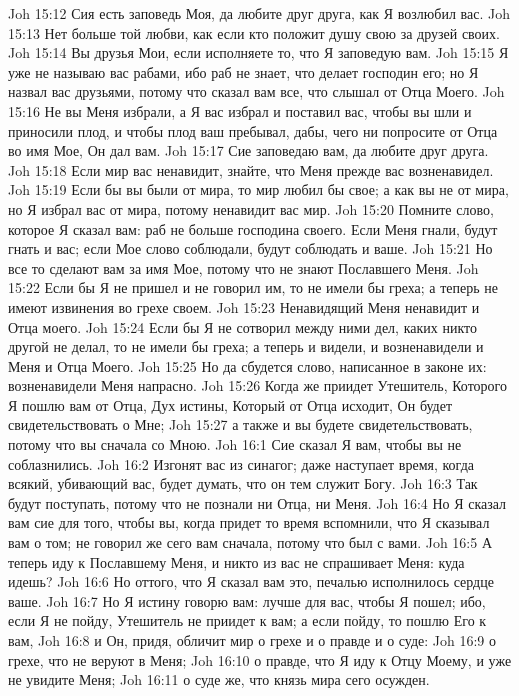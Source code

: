 Joh 15:12  Сия есть заповедь Моя, да любите друг друга, как Я возлюбил вас.
Joh 15:13  Нет больше той любви, как если кто положит душу свою за друзей своих.
Joh 15:14  Вы друзья Мои, если исполняете то, что Я заповедую вам.
Joh 15:15  Я уже не называю вас рабами, ибо раб не знает, что делает господин его; но Я назвал вас друзьями, потому что сказал вам все, что слышал от Отца Моего.
Joh 15:16  Не вы Меня избрали, а Я вас избрал и поставил вас, чтобы вы шли и приносили плод, и чтобы плод ваш пребывал, дабы, чего ни попросите от Отца во имя Мое, Он дал вам.
Joh 15:17  Сие заповедаю вам, да любите друг друга.
Joh 15:18  Если мир вас ненавидит, знайте, что Меня прежде вас возненавидел.
Joh 15:19  Если бы вы были от мира, то мир любил бы свое; а как вы не от мира, но Я избрал вас от мира, потому ненавидит вас мир.
Joh 15:20  Помните слово, которое Я сказал вам: раб не больше господина своего. Если Меня гнали, будут гнать и вас; если Мое слово соблюдали, будут соблюдать и ваше.
Joh 15:21  Но все то сделают вам за имя Мое, потому что не знают Пославшего Меня.
Joh 15:22  Если бы Я не пришел и не говорил им, то не имели бы греха; а теперь не имеют извинения во грехе своем.
Joh 15:23  Ненавидящий Меня ненавидит и Отца моего.
Joh 15:24  Если бы Я не сотворил между ними дел, каких никто другой не делал, то не имели бы греха; а теперь и видели, и возненавидели и Меня и Отца Моего.
Joh 15:25  Но да сбудется слово, написанное в законе их: возненавидели Меня напрасно.
Joh 15:26  Когда же приидет Утешитель, Которого Я пошлю вам от Отца, Дух истины, Который от Отца исходит, Он будет свидетельствовать о Мне;
Joh 15:27  а также и вы будете свидетельствовать, потому что вы сначала со Мною.
Joh 16:1  Сие сказал Я вам, чтобы вы не соблазнились.
Joh 16:2  Изгонят вас из синагог; даже наступает время, когда всякий, убивающий вас, будет думать, что он тем служит Богу.
Joh 16:3  Так будут поступать, потому что не познали ни Отца, ни Меня.
Joh 16:4  Но Я сказал вам сие для того, чтобы вы, когда придет то время вспомнили, что Я сказывал вам о том; не говорил же сего вам сначала, потому что был с вами.
Joh 16:5  А теперь иду к Пославшему Меня, и никто из вас не спрашивает Меня: куда идешь?
Joh 16:6  Но оттого, что Я сказал вам это, печалью исполнилось сердце ваше.
Joh 16:7  Но Я истину говорю вам: лучше для вас, чтобы Я пошел; ибо, если Я не пойду, Утешитель не приидет к вам; а если пойду, то пошлю Его к вам,
Joh 16:8  и Он, придя, обличит мир о грехе и о правде и о суде:
Joh 16:9  о грехе, что не веруют в Меня;
Joh 16:10  о правде, что Я иду к Отцу Моему, и уже не увидите Меня;
Joh 16:11  о суде же, что князь мира сего осужден.
